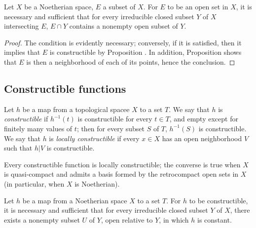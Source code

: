 \begin{cor}[9.2.6]
\label{0.9.2.6}
Let $X$ be a Noetherian space, $E$ a subset of $X$.
For $E$ to be an open set in $X$, it is necessary and sufficient that for every irreducible closed subset $Y$ of $X$ intersecting $E$, $E\cap Y$ contains a nonempty open subset of $Y$.
\end{cor}

\begin{proof}
\label{proof-0.9.2.6}
The condition is evidently necessary; conversely, if it is satisfied, then it implies that $E$ is constructible by Proposition .
In addition, Proposition  shows that $E$ is then a neighborhood of each of its points, hence the conclusion.
\end{proof}

\subsection{Constructible functions}
\label{subsection:constructible-functions}

\begin{defn}[9.3.1]
\label{0.9.3.1}
Let $h$ be a map from a topological spacee $X$ to a set $T$.
We say that $h$ is \emph{constructible} if $h^{-1}(t)$ is constructible for every $t\in T$, and empty except for finitely many values of $t$; then for every subset $S$ of $T$, $h^{-1}(S)$ is constructible.
We say that $h$ is \emph{locally constructible} if every $x\in X$ has an open neighborhood $V$ such that $h|V$ is constructible.
\end{defn}

Every constructible function is locally constructible; the converse is true when $X$ is quasi-compact and admits a basis formed by the retrocompact open sets in $X$ (in particular, when $X$ is Noetherian).

\begin{prop}[9.3.2]
\label{0.9.3.2}
Let $h$ be a map from a Noetherian space $X$ to a set $T$.
For $h$ to be constructible, it is necessary and sufficient that for every irreducible closed subset $Y$ of $X$, there exists a nonempty subset $U$ of $Y$, open relative to $Y$, in which $h$ is constant.
\end{prop}


